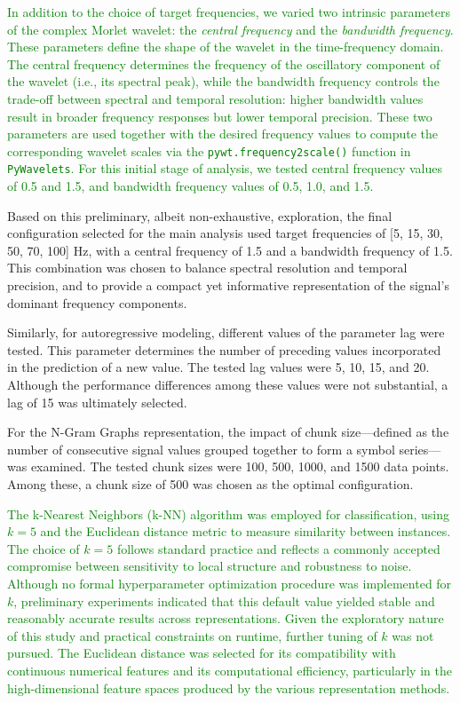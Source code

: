 \documentclass{article}
\begin{document}
\textcolor{green}{In addition to the choice of target frequencies, we varied two intrinsic parameters of the complex Morlet wavelet: the \textit{central frequency} and the \textit{bandwidth frequency}. These parameters define the shape of the wavelet in the time-frequency domain. The central frequency determines the frequency of the oscillatory component of the wavelet (i.e., its spectral peak), while the bandwidth frequency controls the trade-off between spectral and temporal resolution: higher bandwidth values result in broader frequency responses but lower temporal precision. These two parameters are used together with the desired frequency values to compute the corresponding wavelet scales via the \texttt{pywt.frequency2scale()} function in \texttt{PyWavelets}. For this initial stage of analysis, we tested central frequency values of 0.5 and 1.5, and bandwidth frequency values of 0.5, 1.0, and 1.5.}

Based on this preliminary, albeit non-exhaustive, exploration, the final configuration selected for the main analysis used target frequencies of [5, 15, 30, 50, 70, 100] Hz, with a central frequency of 1.5 and a bandwidth frequency of 1.5. This combination was chosen to balance spectral resolution and temporal precision, and to provide a compact yet informative representation of the signal’s dominant frequency components.

Similarly, for autoregressive modeling, different values of the parameter lag were tested. This parameter determines the number of preceding values incorporated in the prediction of a new value. The tested lag values were 5, 10, 15, and 20. Although the performance differences among these values were not substantial, a lag of 15 was ultimately selected.

For the N-Gram Graphs representation, the impact of chunk size—defined as the number of consecutive signal values grouped together to form a symbol series—was examined. The tested chunk sizes were 100, 500, 1000, and 1500 data points. Among these, a chunk size of 500 was chosen as the optimal configuration.

\textcolor{green}{The k-Nearest Neighbors (k-NN) algorithm was employed for classification, using $k = 5$ and the Euclidean distance metric to measure similarity between instances. The choice of $k = 5$ follows standard practice and reflects a commonly accepted compromise between sensitivity to local structure and robustness to noise. Although no formal hyperparameter optimization procedure was implemented for $k$, preliminary experiments indicated that this default value yielded stable and reasonably accurate results across representations. Given the exploratory nature of this study and practical constraints on runtime, further tuning of $k$ was not pursued. The Euclidean distance was selected for its compatibility with continuous numerical features and its computational efficiency, particularly in the high-dimensional feature spaces produced by the various representation methods.}
\end{document}

